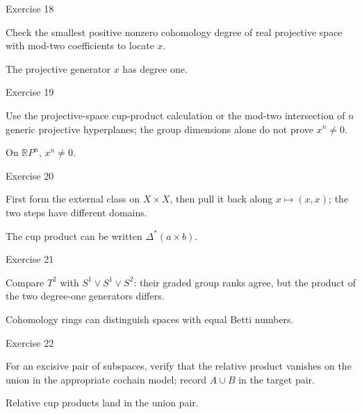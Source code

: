 \begin{exercise}\label{exr:viii29-18}
Exercise 18
\end{exercise}
\begin{hint}
Check the smallest positive nonzero cohomology degree of real projective space with mod-two coefficients to locate \(x\).
\end{hint}
\begin{solution}
The projective generator \(x\) has degree one.
\end{solution}

\begin{exercise}\label{exr:viii29-19}
Exercise 19
\end{exercise}
\begin{hint}
Use the projective-space cup-product calculation or the mod-two intersection of \(n\) generic projective hyperplanes; the group dimensions alone do not prove \(x^n\ne0\).
\end{hint}
\begin{solution}
On \(\mathbb RP^n\), \(x^n\ne0\).
\end{solution}

\begin{exercise}\label{exr:viii29-20}
Exercise 20
\end{exercise}
\begin{hint}
First form the external class on \(X\times X\), then pull it back along \(x\mapsto(x,x)\); the two steps have different domains.
\end{hint}
\begin{solution}
The cup product can be written \(\Delta^*(a\times b)\).
\end{solution}

\begin{exercise}\label{exr:viii29-21}
Exercise 21
\end{exercise}
\begin{hint}
Compare \(T^2\) with \(S^1\vee S^1\vee S^2\): their graded group ranks agree, but the product of the two degree-one generators differs.
\end{hint}
\begin{solution}
Cohomology rings can distinguish spaces with equal Betti numbers.
\end{solution}

\begin{exercise}\label{exr:viii29-22}
Exercise 22
\end{exercise}
\begin{hint}
For an excisive pair of subspaces, verify that the relative product vanishes on the union in the appropriate cochain model; record \(A\cup B\) in the target pair.
\end{hint}
\begin{solution}
Relative cup products land in the union pair.
\end{solution}

